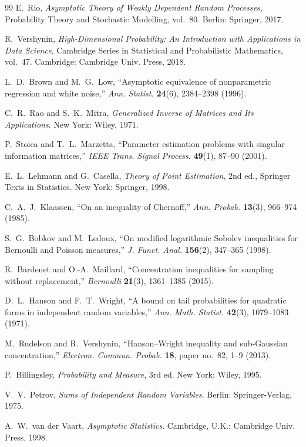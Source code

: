 \begin{thebibliography}{99}
E.~Rio, \emph{Asymptotic Theory of Weakly Dependent Random Processes}, Probability Theory and Stochastic Modelling, vol.~80. Berlin: Springer, 2017.

R.~Vershynin, \emph{High-Dimensional Probability: An Introduction with Applications in Data Science}, Cambridge Series in Statistical and Probabilistic Mathematics, vol.~47. Cambridge: Cambridge Univ. Press, 2018.

L.~D.~Brown and M.~G.~Low, ``Asymptotic equivalence of nonparametric regression and white noise,'' \emph{Ann. Statist.} \textbf{24}(6), 2384--2398 (1996).

C.~R.~Rao and S.~K.~Mitra, \emph{Generalized Inverse of Matrices and Its Applications}. New York: Wiley, 1971.

P.~Stoica and T.~L.~Marzetta, ``Parameter estimation problems with singular information matrices,'' \emph{IEEE Trans. Signal Process.} \textbf{49}(1), 87--90 (2001).

E.~L.~Lehmann and G.~Casella, \emph{Theory of Point Estimation}, 2nd ed., Springer Texts in Statistics. New York: Springer, 1998.

C.~A.~J.~Klaassen, ``On an inequality of Chernoff,'' \emph{Ann. Probab.} \textbf{13}(3), 966--974 (1985).

S.~G.~Bobkov and M.~Ledoux, ``On modified logarithmic Sobolev inequalities for Bernoulli and Poisson measures,'' \emph{J. Funct. Anal.} \textbf{156}(2), 347--365 (1998).

R.~Bardenet and O.-A.~Maillard, ``Concentration inequalities for sampling without replacement,'' \emph{Bernoulli} \textbf{21}(3), 1361--1385 (2015).

D.~L.~Hanson and F.~T.~Wright, ``A bound on tail probabilities for quadratic forms in independent random variables,'' \emph{Ann. Math. Statist.} \textbf{42}(3), 1079--1083 (1971).

M.~Rudelson and R.~Vershynin, ``Hanson--Wright inequality and sub-Gaussian concentration,'' \emph{Electron. Commun. Probab.} \textbf{18}, paper no.~82, 1--9 (2013).

P.~Billingsley, \emph{Probability and Measure}, 3rd ed. New York: Wiley, 1995.

V.~V.~Petrov, \emph{Sums of Independent Random Variables}. Berlin: Springer-Verlag, 1975.

A.~W.~van der Vaart, \emph{Asymptotic Statistics}. Cambridge, U.K.: Cambridge Univ. Press, 1998.

\end{thebibliography}
